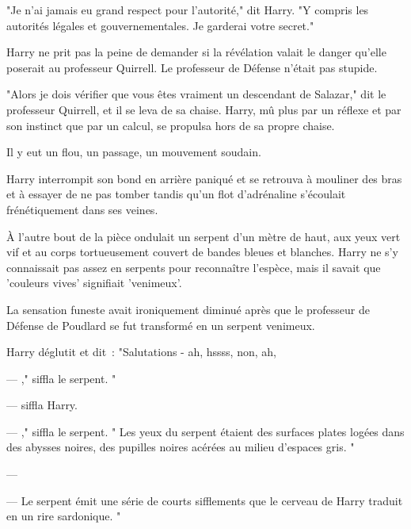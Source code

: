 "Je n'ai jamais eu grand respect pour l'autorité," dit Harry. "Y compris les autorités légales et gouvernementales. Je garderai votre secret."

Harry ne prit pas la peine de demander si la révélation valait le danger qu'elle poserait au professeur Quirrell. Le professeur de Défense n'était pas stupide.

"Alors je dois vérifier que vous êtes vraiment un descendant de Salazar," dit le professeur Quirrell, et il se leva de sa chaise. Harry, mû plus par un réflexe et par son instinct que par un calcul, se propulsa hors de sa propre chaise.

Il y eut un flou, un passage, un mouvement soudain.

Harry interrompit son bond en arrière paniqué et se retrouva à mouliner des bras et à essayer de ne pas tomber tandis qu'un flot d'adrénaline s'écoulait frénétiquement dans ses veines.

À l'autre bout de la pièce ondulait un serpent d'un mètre de haut, aux yeux vert vif et au corps tortueusement couvert de bandes bleues et blanches. Harry ne s'y connaissait pas assez en serpents pour reconnaître l'espèce, mais il savait que 'couleurs vives' signifiait 'venimeux'.

La sensation funeste avait ironiquement diminué après que le professeur de Défense de Poudlard se fut transformé en un serpent venimeux.

Harry déglutit et dit~: "Salutations - ah, hssss, non, ah,

--- ," siffla le serpent. "

---  siffla Harry. 

--- ," siffla le serpent. " Les yeux du serpent étaient des surfaces plates logées dans des abysses noires, des pupilles noires acérées au milieu d'espaces gris. "

--- 

---  Le serpent émit une série de courts sifflements que le cerveau de Harry traduit en un rire sardonique. "


